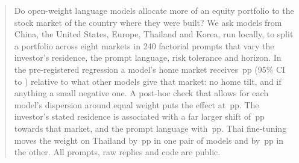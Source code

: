 \begin{abstract}
\noindent Do open-weight language models allocate more of an equity portfolio to the stock market of the country where they were built? We ask \nModelsRun{} models from China, the United States, Europe, Thailand and Korea, run locally, to split a portfolio across eight markets in 240 factorial prompts that vary the investor's residence, the prompt language, risk tolerance and horizon. In the pre-registered regression a model's home market receives \betaHome{}\,pp (95\% CI \betaHomeLo{} to \betaHomeHi{}) relative to what other models give that market: no home tilt, and if anything a small negative one. A post-hoc check that allows for each model's dispersion around equal weight puts the effect at \betaPosthocDisp{}\,pp. The investor's stated residence is associated with a far larger shift of \gammaInv{}\,pp towards that market, and the prompt language with \lambdaLang{}\,pp. Thai fine-tuning moves the weight on Thailand by \ftTyphoontwoEightb{}\,pp in one pair of models and by \ftOpenthaigptoneFiveSevenb{}\,pp in the other. All prompts, raw replies and code are public.
\end{abstract}

\medskip
{}
